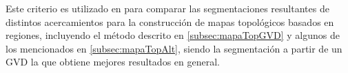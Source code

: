 Este criterio es utilizado en \cite{bormann2016room,Fermin-Leon2017}
para comparar las segmentaciones resultantes de distintos acercamientos para la
construcción de mapas topológicos basados en regiones, incluyendo el método
descrito en \ref{subsec:mapaTopGVD} y algunos de los mencionados en
\ref{subsec:mapaTopAlt}, siendo la segmentación a partir de un GVD la que
obtiene mejores resultados en general.  



